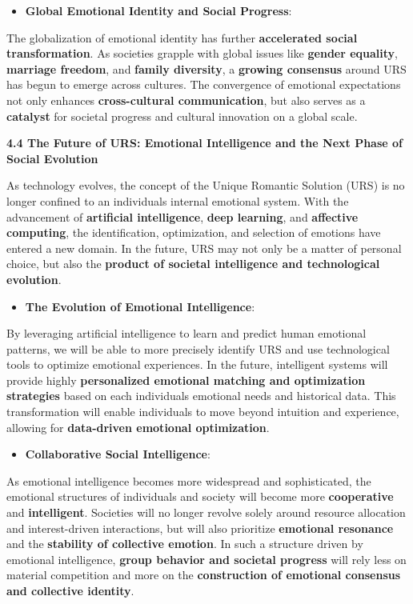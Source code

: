 \documentclass[
]{article}
\begin{document}
\begin{itemize}
\item
  \textbf{Global Emotional Identity and Social Progress}:
\end{itemize}

The globalization of emotional identity has further \textbf{accelerated
social transformation}. As societies grapple with global issues like
\textbf{gender equality}, \textbf{marriage freedom}, and \textbf{family
diversity}, a \textbf{growing consensus} around URS has begun to emerge
across cultures. The convergence of emotional expectations not only
enhances \textbf{cross-cultural communication}, but also serves as a
\textbf{catalyst} for societal progress and cultural innovation on a
global scale.

\textbf{4.4 The Future of URS: Emotional Intelligence and the Next Phase
of Social Evolution}

As technology evolves, the concept of the Unique Romantic Solution (URS)
is no longer confined to an individual\textquotesingle s internal
emotional system. With the advancement of \textbf{artificial
intelligence}, \textbf{deep learning}, and \textbf{affective computing},
the identification, optimization, and selection of emotions have entered
a new domain. In the future, URS may not only be a matter of personal
choice, but also the \textbf{product of societal intelligence and
technological evolution}.

\begin{itemize}
\item
  \textbf{The Evolution of Emotional Intelligence}:
\end{itemize}

By leveraging artificial intelligence to learn and predict human
emotional patterns, we will be able to more precisely identify URS and
use technological tools to optimize emotional experiences. In the
future, intelligent systems will provide highly \textbf{personalized
emotional matching and optimization strategies} based on each
individual\textquotesingle s emotional needs and historical data. This
transformation will enable individuals to move beyond intuition and
experience, allowing for \textbf{data-driven emotional optimization}.

\begin{itemize}
\item
  \textbf{Collaborative Social Intelligence}:
\end{itemize}

As emotional intelligence becomes more widespread and sophisticated, the
emotional structures of individuals and society will become more
\textbf{cooperative} and \textbf{intelligent}. Societies will no longer
revolve solely around resource allocation and interest-driven
interactions, but will also prioritize \textbf{emotional resonance} and
the \textbf{stability of collective emotion}. In such a structure driven
by emotional intelligence, \textbf{group behavior and societal progress}
will rely less on material competition and more on the
\textbf{construction of emotional consensus and collective identity}.
\end{document}
